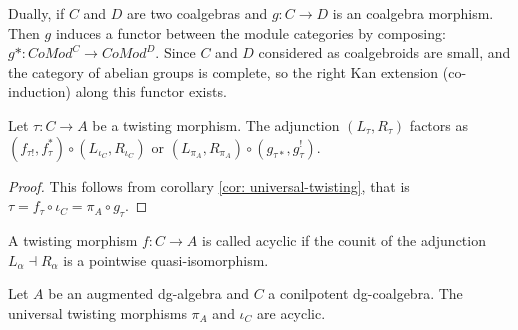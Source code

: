 \documentclass[../thesis.tex]{subfiles}
\begin{document}
            Dually, if $C$ and $D$ are two coalgebras and $g : C \rightarrow D$ is an coalgebra morphism. Then $g$ induces a functor between the module categories by composing: $g* : CoMod^C \rightarrow CoMod^D$. Since $C$ and $D$ considered as coalgebroids are small, and the category of abelian groups is complete, so the right Kan extension (co-induction) along this functor exists.
            \begin{center}
            \end{center}

            \begin{lemma}
                Let $\tau : C \rightarrow A$ be a twisting morphism. The adjunction $(L_\tau, R_\tau)$ factors as $(f_{\tau !}, f_\tau^*)\circ (L_{\iota_C},R_{\iota_C})$ or $(L_{\pi_A},R_{\pi_A})\circ (g_{\tau *}, g_\tau^!)$.
            \end{lemma}

            \begin{proof}
                This follows from corollary \ref{cor: universal-twisting}, that is $\tau = f_\tau \circ \iota_C = \pi_A\circ g_\tau$.
            \end{proof}

            \begin{definition}
                A twisting morphism $f: C \rightarrow A$ is called acyclic if the counit of the adjunction $L_\alpha \dashv R_\alpha$ is a pointwise quasi-isomorphism.
            \end{definition}

            \begin{lemma}
                Let $A$ be an augmented dg-algebra and $C$ a conilpotent dg-coalgebra. The universal twisting morphisms $\pi_A$ and $\iota_C$ are acyclic.
            \end{lemma}
\end{document}
